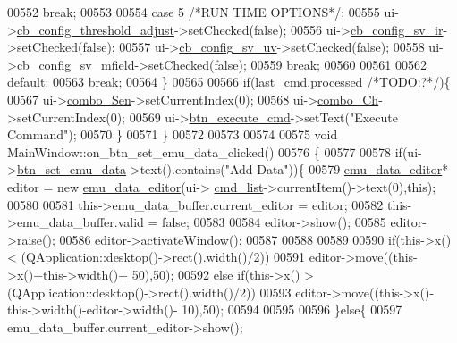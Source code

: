 \begin{DoxyCode}
00552         \textcolor{keywordflow}{break};
00553 
00554         \textcolor{keywordflow}{case} 5 \textcolor{comment}{/*RUN TIME OPTIONS*/}:
00555              ui->\hyperlink{a00080_a433ffc427e1103e6c2939f949ee5e5b5}{cb\_config\_threshold\_adjust}->setChecked(\textcolor{keyword}{false});
00556              ui->\hyperlink{a00080_a4db3ccfbbf8c5222dd2f042d3073bbe8}{cb\_config\_sv\_ir}->setChecked(\textcolor{keyword}{false});
00557              ui->\hyperlink{a00080_a3a93cd0a3f3738aad252d063a8677839}{cb\_config\_sv\_uv}->setChecked(\textcolor{keyword}{false});
00558              ui->\hyperlink{a00080_a0a83284035ab2dbaeb39946522434986}{cb\_config\_sv\_mfield}->setChecked(\textcolor{keyword}{false});
00559         \textcolor{keywordflow}{break};
00560 
00561 
00562     \textcolor{keywordflow}{default}:
00563         \textcolor{keywordflow}{break};
00564     \}
00565 
00566     \textcolor{keywordflow}{if}(last\_cmd.\hyperlink{a00004_a3e88f779da9798a5da7dda227e2ca388}{processed} \textcolor{comment}{/*TODO:?*/})\{
00567     ui->\hyperlink{a00080_ad95005b5fcac8126171019298147b285}{combo\_Sen}->setCurrentIndex(0);
00568     ui->\hyperlink{a00080_a263fb43f2eff37a44ff7359ba41e2eeb}{combo\_Ch}->setCurrentIndex(0);
00569     ui->\hyperlink{a00080_a9ea50d44e38316e4203933698cbc14a6}{btn\_execute\_cmd}->setText(\textcolor{stringliteral}{"Execute Command"});
00570     \}
00571 \}
00572 
00573 
00574 
00575 \textcolor{keywordtype}{void} MainWindow::on\_btn\_set\_emu\_data\_clicked()
00576 \{
00577 
00578     \textcolor{keywordflow}{if}(ui->\hyperlink{a00080_ad05944ce9c8afb0ab60549a326b8e0af}{btn\_set\_emu\_data}->text().contains(\textcolor{stringliteral}{"Add Data"}))\{
00579     \hyperlink{a00008}{emu\_data\_editor}* editor = \textcolor{keyword}{new} \hyperlink{a00008}{emu\_data\_editor}(ui->
      \hyperlink{a00080_aa66ece71395b435e915d384fb63bac1d}{cmd\_list}->currentItem()->text(0),\textcolor{keyword}{this});
00580 
00581     this->emu\_data\_buffer.current\_editor = editor;
00582     this->emu\_data\_buffer.valid          = \textcolor{keyword}{false};
00583 
00584     editor->show();
00585     editor->raise();
00586     editor->activateWindow();
00587 
00588 
00589 
00590     \textcolor{keywordflow}{if}(this->x() < (QApplication::desktop()->rect().width()/2))
00591     editor->move((this->x()+this->width()+ 50),50);
00592     \textcolor{keywordflow}{else} \textcolor{keywordflow}{if}(this->x() > (QApplication::desktop()->rect().width()/2))
00593     editor->move((this->x()-this->width()-editor->width()- 10),50);
00594 
00595 
00596  \}\textcolor{keywordflow}{else}\{
00597       emu\_data\_buffer.current\_editor->show();

\end{DoxyCode}
